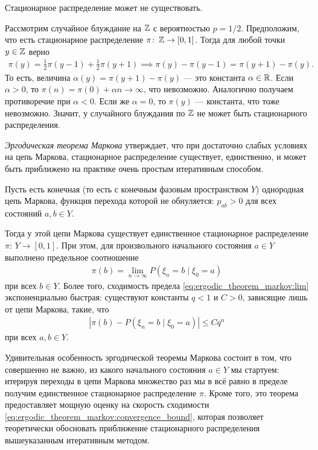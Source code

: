 \documentclass[../main.tex]{subfiles}
\begin{document}
\begin{exmpl}
 Стационарное распределение может не существовать.

 Рассмотрим случайное блуждание на $ \mathbb{Z} $ с вероятностью $ p = 1 / 2 $. Предположим, что есть стационарное распределение $ \pi \colon\, \mathbb{Z} \to [0,1] $. Тогда для любой точки $ y \in \mathbb{Z} $ верно
 \begin{align*}
  \pi(y) = \frac{1}{2}\pi(y-1) + \frac{1}{2}\pi(y+1) \implies \pi(y) - \pi(y-1) = \pi(y+1) - \pi(y).
 \end{align*} То есть, величина $ \alpha(y) = \pi(y+1) - \pi(y) $  --- это константа $ \alpha \in \mathbb{R} $. Если $ \alpha > 0 $, то $ \pi(n) = \pi(0) + \alpha n \to \infty $, что невозможно. Аналогично получаем противоречие при $ \alpha < 0 $. Если же $ \alpha = 0 $, то $ \pi(y) $ --- константа, что тоже невозможно. Значит, у случайного блуждания по $ \mathbb{Z} $ не может быть стационарного распределения.
\end{exmpl}

\textit{Эргодическая теорема Маркова} утверждает, что при достаточно слабых условиях на цепь Маркова, стационарное распределение существует, единственно, и может быть приближено на практике очень простым итеративным способом.

\begin{thm}
 \label{theorem:ergodic_theorem_markov}
 Пусть есть конечная (то есть с конечным фазовым пространством $ Y $) однородная цепь Маркова, функция перехода которой не обнуляется: $ p_{ab} > 0 $ для всех состояний $ a,b\in Y $.

 Тогда у этой цепи Маркова существует единственное стационарное распределение $ \pi\colon\,Y\to[0,1] $. При этом, для произвольного начального состояния $ a \in Y $ выполнено предельное соотношение
 \begin{align}
  \label{eq:ergodic_theorem_markov:lim}
  \pi(b) = \lim_{n \to \infty} P(\xi_n = b \mid \xi_0 = a)
 \end{align} при всех $ b \in Y $. Более того, сходимость предела \eqref{eq:ergodic_theorem_markov:lim} экспоненциально быстрая: существуют константы $ q < 1 $ и $ C> 0 $, зависящие лишь от цепи Маркова, такие, что
 \begin{align}
  \label{eq:ergodic_theorem_markov:convergence_bound}
  \left| \pi(b) - P(\xi_n = b \mid \xi_0 = a) \right| \leqslant C q^{n}
 \end{align} при всех $ a,b\in Y $.
\end{thm}

Удивительная особенность эргодической теоремы Маркова состоит в том, что совершенно не важно, из какого начального состояния $ a \in Y $ мы стартуем: итерируя переходы в цепи Маркова множество раз мы в всё равно в пределе получим единственное стационарное распределение $ \pi $. Кроме того, это теорема предоставляет мощную оценку на скорость сходимости \eqref{eq:ergodic_theorem_markov:convergence_bound}, которая позволяет теоретически обосновать приближение стационарного распределения вышеуказанным итеративным методом.
\end{document}
